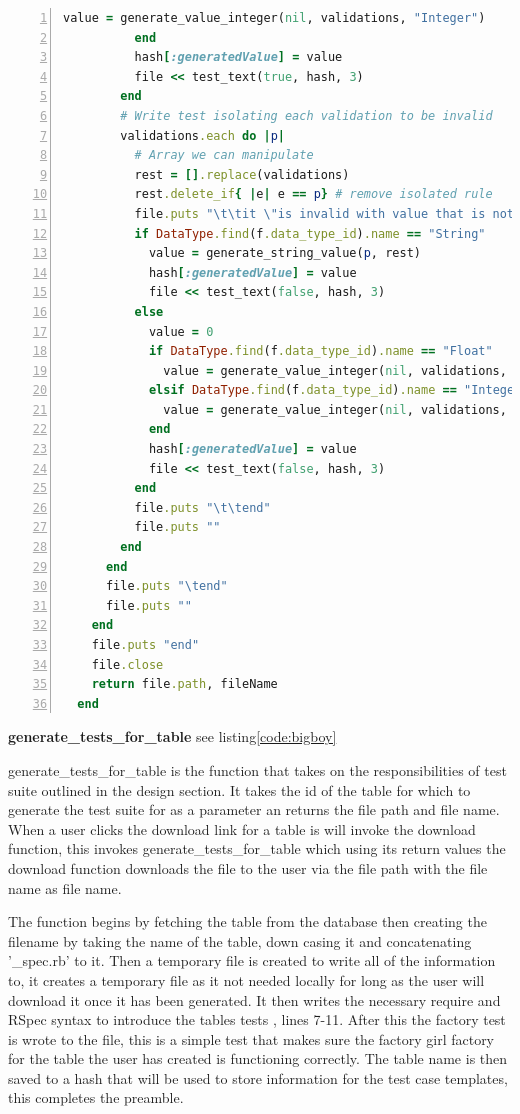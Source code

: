 \documentclass[a4paper,12pt]{article}
\begin{document}
\begin{lstlisting}[frame=single,numbers=left,language = ruby,caption= {generate\_tests\_for\_table}, label={code:bigboy}]
            value = generate_value_integer(nil, validations, "Integer")
          end
          hash[:generatedValue] = value
          file << test_text(true, hash, 3)
        end
        # Write test isolating each validation to be invalid
        validations.each do |p|
          # Array we can manipulate
          rest = [].replace(validations)
          rest.delete_if{ |e| e == p} # remove isolated rule
          file.puts "\t\tit \"is invalid with value that is not " + p[0].to_s + " " + p[1].to_s + "\" do"
          if DataType.find(f.data_type_id).name == "String"
            value = generate_string_value(p, rest)
            hash[:generatedValue] = value
            file << test_text(false, hash, 3)
          else
            value = 0
            if DataType.find(f.data_type_id).name == "Float"
              value = generate_value_integer(nil, validations, "Float")
            elsif DataType.find(f.data_type_id).name == "Integer"
              value = generate_value_integer(nil, validations, "Integer")
            end
            hash[:generatedValue] = value
            file << test_text(false, hash, 3)
          end
          file.puts "\t\tend"
          file.puts ""
        end
      end
      file.puts "\tend"
      file.puts ""
    end
    file.puts "end"
    file.close
    return file.path, fileName
  end
\end{lstlisting}
\par \textbf{generate\_tests\_for\_table} see listing\ref{code:bigboy}
\par generate\_tests\_for\_table is the function that takes on the responsibilities of test suite outlined in the design section. It takes the id of the table for which to generate the test suite for as a parameter an returns the file path and file name. When a user clicks the download link for a table is will invoke the download function, this invokes generate\_tests\_for\_table which using its return values the download function downloads the file to the user via the file path with the file name as file name.
\vspace{3mm}
\par The function begins by fetching the table from the database then creating the filename by taking the name of the table, down casing it and concatenating '\_spec.rb' to it. Then a temporary file is created to write all of the information to, it creates a temporary file as it not needed locally for long as the user will download it once it has been generated. It then writes the necessary require and RSpec syntax to introduce the tables tests , lines 7-11. After this the factory test is wrote to the file, this is a simple test that makes sure the factory girl factory for the table the user has created is functioning correctly. The table name is then saved to a hash that will be used to store information for the test case templates, this completes the preamble.
\end{document}
